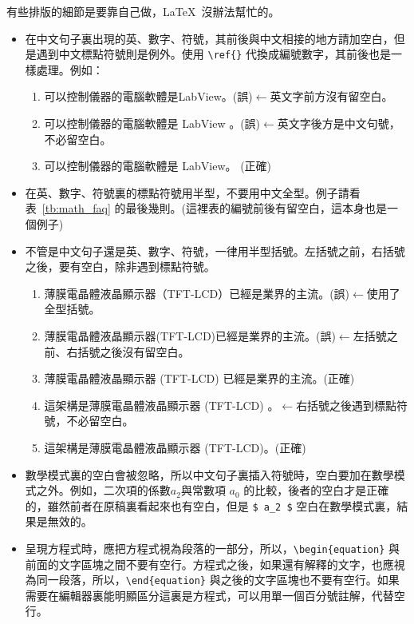 有些排版的細節是要靠自己做，\LaTeX\ 沒辦法幫忙的。
	\begin{itemize}
	\item 在中文句子裏出現的英、數字、符號，其前後與中文相接的地方請加空白，但是遇到中文標點符號則是例外。使用 \verb+\ref{}+ 代換成編號數字，其前後也是一樣處理。例如：
		\begin{enumerate}
		\item 可以控制儀器的電腦軟體是LabView。(誤)\quad$\leftarrow$英文字前方沒有留空白。
		\item 可以控制儀器的電腦軟體是 LabView 。(誤)\quad$\leftarrow$英文字後方是中文句號，不必留空白。
		\item 可以控制儀器的電腦軟體是 LabView。 (正確)
		\end{enumerate}

	\item 在英、數字、符號裏的標點符號用半型，不要用中文全型。例子請看表~\ref{tb:math_faq} 的最後幾則。(這裡表的編號前後有留空白，這本身也是一個例子)
	
	\item 不管是中文句子還是英、數字、符號，一律用半型括號。左括號之前，右括號之後，要有空白，除非遇到標點符號。
		\begin{enumerate}
		\item 薄膜電晶體液晶顯示器（TFT-LCD）已經是業界的主流。(誤)\quad$\leftarrow$使用了全型括號。
		
		\item 薄膜電晶體液晶顯示器(TFT-LCD)已經是業界的主流。(誤)\quad$\leftarrow$左括號之前、右括號之後沒有留空白。
		
		\item 薄膜電晶體液晶顯示器 (TFT-LCD) 已經是業界的主流。(正確)
		
		\item 這架構是薄膜電晶體液晶顯示器 (TFT-LCD) 。\quad$\leftarrow$右括號之後遇到標點符號，不必留空白。
		
		\item 這架構是薄膜電晶體液晶顯示器 (TFT-LCD)。(正確)
		\end{enumerate}

	\item 數學模式裏的空白會被忽略，所以中文句子裏插入符號時，空白要加在數學模式之外。例如，二次項的係數$ a_2 $與常數項 $a_0$ 的比較，後者的空白才是正確的，雖然前者在原稿裏看起來也有空白，但是 \verb+$ a_2 $+ 空白在數學模式裏，結果是無效的。

	\item 呈現方程式時，應把方程式視為段落的一部分，所以，\verb+\begin{equation}+ 與前面的文字區塊之間不要有空行。方程式之後，如果還有解釋的文字，也應視為同一段落，所以，\verb+\end{equation}+ 與之後的文字區塊也不要有空行。如果需要在編輯器裏能明顯區分這裏是方程式，可以用單一個百分號註解，代替空行。
	

\end{itemize}

